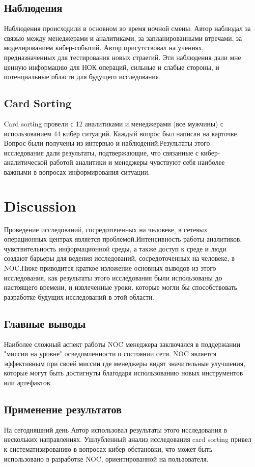 \documentclass[12pt,]{article}
\begin{document}
\subsection{Наблюдения}
Наблюдения происходили в основном во время ночной смены. Автор наблюдал за связью между менеджерами и аналитиками, за запланированными втречами, за моделированием кибер-событий. Автор присутствовал на учениях, предназначенных для тестирования новых страегий. Эти наблюдения дали мне ценную информацию для НОК операций, сильные и слабые стороны, и потенциальные области для будущего исследования.
\subsection{Card Sorting}
Card sorting провели с 12 аналитиками и менеджерами (все мужчины) с использованием 44 кибер ситуаций. Каждый вопрос был написан на карточке. Вопрос были получены из интервью и наблюдений.Результаты этого исследования дали результаты, подтвержающие, что связанные с кибер-аналитической работой аналитики и менеджеры чувствуют себя наиболее важными в вопросах информирования ситуации.   
\section{Discussion}
Проведение исследований, сосредоточенных на человеке, в сетевых операционных центрах является проблемой.Интенсивность работы аналитиков, чувствительность информационной среды, а также доступ к среде и люди создают барьеры для ведения исследований, сосредоточенных на человеке, в NOC.Ниже приводится краткое изложение основных выводов из этого исследования, как результаты этого исследования были использованы до настоящего времени, и извлеченные уроки, которые могли бы способствовать разработке будущих исследований в этой области.
\subsection{Главные выводы}
Наиболее сложный аспект работы NOC менеджера заключался в поддержании "миссии на уровне" осведомленности о состоянии сети. NOC является эффективным при своей миссии где менеджеры видят значительные улучшения, которые могут быть достигнуты благодаря использованию новых инструментов или артефактов.
\subsection{Применение результатов}
На сегодняшний день Автор использовал результаты этого исследования в нескольких направлениях. Ушлубленный анализ исследования card sorting привел к систематизированию в вопросах кибер обстановки, что  может быть использовано в разработке NOC, ориентированной на пользователя.
\end{document}
